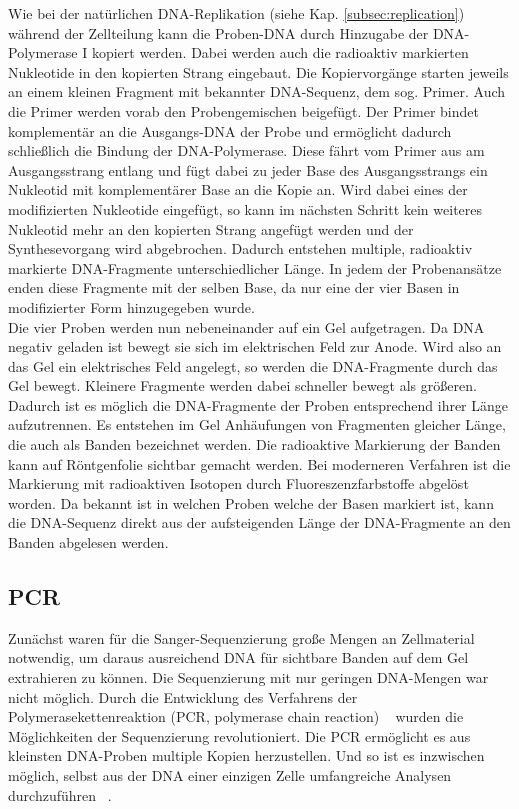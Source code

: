 Wie bei der natürlichen DNA-Replikation (siehe Kap. \ref{subsec:replication}) während der Zellteilung kann die Proben-DNA durch Hinzugabe der DNA-Polymerase I kopiert werden. Dabei werden auch die radioaktiv markierten Nukleotide in den kopierten Strang eingebaut. Die Kopiervorgänge starten jeweils an einem kleinen Fragment mit bekannter DNA-Sequenz, dem sog. Primer. Auch die Primer werden vorab den Probengemischen beigefügt. Der Primer bindet komplementär an die Ausgangs-DNA der Probe und  ermöglicht dadurch schließlich die Bindung der DNA-Polymerase. Diese fährt vom Primer aus am Ausgangsstrang entlang und fügt dabei zu jeder Base des Ausgangsstrangs ein Nukleotid mit komplementärer Base an die Kopie an. Wird dabei eines der modifizierten Nukleotide eingefügt, so kann im nächsten Schritt kein weiteres Nukleotid mehr an den kopierten Strang angefügt werden und der Synthesevorgang wird abgebrochen. Dadurch entstehen multiple, radioaktiv markierte DNA-Fragmente unterschiedlicher Länge. In jedem der Probenansätze enden diese Fragmente mit der selben Base, da nur eine der vier Basen in modifizierter Form hinzugegeben wurde. \\

Die vier Proben werden nun nebeneinander auf ein Gel aufgetragen. Da DNA negativ geladen ist bewegt sie sich im elektrischen Feld zur Anode. Wird also an das Gel ein elektrisches Feld angelegt, so werden die DNA-Fragmente durch das Gel bewegt. Kleinere Fragmente werden dabei schneller bewegt als größeren. Dadurch ist es möglich die DNA-Fragmente der Proben entsprechend ihrer Länge aufzutrennen. Es entstehen im Gel Anhäufungen von Fragmenten gleicher Länge, die auch als Banden bezeichnet werden. Die radioaktive Markierung der Banden kann auf Röntgenfolie sichtbar gemacht werden. Bei moderneren Verfahren ist die Markierung mit radioaktiven Isotopen durch Fluoreszenzfarbstoffe abgelöst worden. Da bekannt ist in welchen Proben welche der Basen markiert ist, kann die DNA-Sequenz direkt aus der aufsteigenden Länge der DNA-Fragmente an den Banden abgelesen werden. \\

\subsection{PCR}  \label{subsec:pcr}

Zunächst waren für die Sanger-Sequenzierung große Mengen an Zellmaterial notwendig, um daraus ausreichend DNA für sichtbare Banden auf dem Gel extrahieren zu können. Die Sequenzierung mit nur geringen DNA-Mengen war nicht möglich. Durch die Entwicklung des Verfahrens der Polymerasekettenreaktion (PCR, polymerase chain reaction) ~\cite{mullis_1986} wurden die Möglichkeiten der Sequenzierung revolutioniert. Die PCR ermöglicht es aus kleinsten DNA-Proben multiple Kopien herzustellen. Und so ist es inzwischen möglich, selbst aus der DNA einer einzigen Zelle umfangreiche Analysen durchzuführen ~\cite{gawad_2016}. \\

